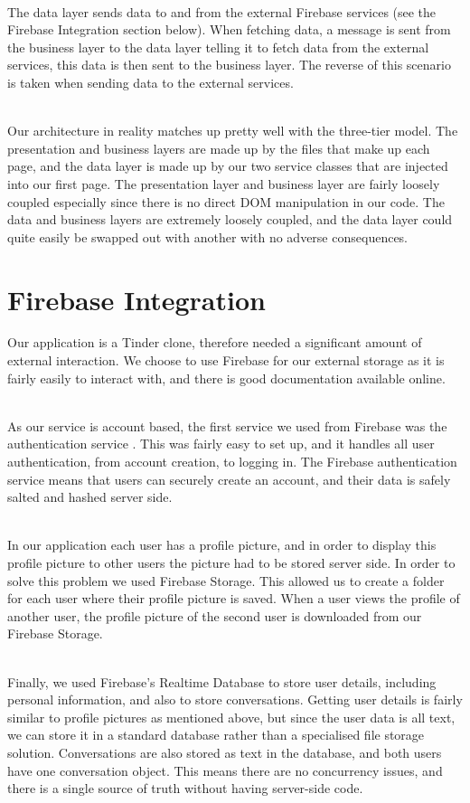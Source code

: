 \documentclass[a4paper, 11pt]{article}
\begin{document}
~\\
The data layer sends data to and from the external Firebase services (see the Firebase Integration section below). When fetching data, a message is sent from the business layer to the data layer telling it to fetch data from the external services, this data is then sent to the business layer. The reverse of this scenario is taken when sending data to the external services.

~\\
Our architecture in reality matches up pretty well with the three-tier model. The presentation and business layers are made up by the files that make up each page, and the data layer is made up by our two service classes that are injected into our first page. The presentation layer and business layer are fairly loosely coupled especially since there is no direct DOM manipulation in our code. The data and business layers are extremely loosely coupled, and the data layer could quite easily be swapped out with another with no adverse consequences.


\section{Firebase Integration}
Our application is a Tinder clone, therefore needed a significant amount of external interaction. We choose to use Firebase for our external storage as it is fairly easily to interact with, and there is good documentation available online. 

~\\
As our service is account based, the first service we used from Firebase was the authentication service \cite{FirebaseAuth}. This was fairly easy to set up, and it handles all user authentication, from account creation, to logging in. The Firebase authentication service means that users can securely create an account, and their data is safely salted and hashed server side.

~\\
In our application each user has a profile picture, and in order to display this profile picture to other users the picture had to be stored server side. In order to solve this problem we used Firebase Storage. This allowed us to create a folder for each user where their profile picture is saved. When a user views the profile of another user, the profile picture of the second user is downloaded from our Firebase Storage.

~\\
Finally, we used Firebase's Realtime Database \cite{firebaseDB} to store user details, including personal information, and also to store conversations. Getting user details is fairly similar to profile pictures as mentioned above, but since the user data is all text, we can store it in a standard database rather than a specialised file storage solution. Conversations are also stored as text in the database, and both users have one conversation object. This means there are no concurrency issues, and there is a single source of truth without having server-side code.
\end{document}
